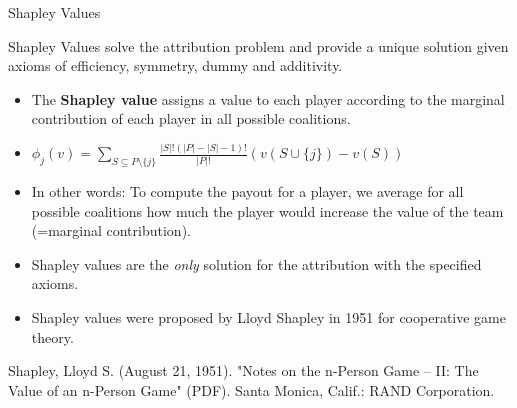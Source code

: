 \documentclass[11pt,compress,t,notes=noshow, xcolor=table]{beamer}
\begin{document}
\begin{vbframe}{Shapley Values}
 
  Shapley Values solve the attribution problem and provide a unique solution given axioms of efficiency, symmetry, dummy and additivity.
\begin{itemize}
  \item The \textbf{Shapley value} assigns a value to each player according to the marginal contribution of each player in all possible coalitions.
  \item $\phi_j(v) = \sum_{S \subseteq P \setminus \{j\}} \frac{|S|!(|P| - |S| - 1)!}{|P|!}(v(S \cup \{j\}) - v(S))$
  \item In other words: To compute the payout for a player, we average for all possible coalitions how much the player would increase the value of the team (=marginal contribution).
  \item Shapley values are the \textit{only} solution for the attribution with the specified axioms.
  \item Shapley values were proposed by Lloyd Shapley in 1951 for cooperative game theory.
\end{itemize}

\tiny{ Shapley, Lloyd S. (August 21, 1951). "Notes on the n-Person Game -- II: The Value of an n-Person Game" (PDF). Santa Monica, Calif.: RAND Corporation.}

\end{vbframe}
\end{document}
